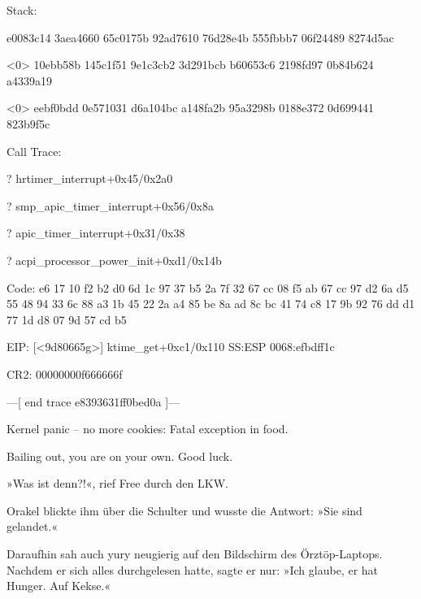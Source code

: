 \begin{tiny}
\begin{ttfamily}
\noindent [376730.313461] Stack:

\noindent [376730.313461]  e0083c14 3aea4660 65c0175b 92ad7610 76d28e4b 555fbbb7 06f24489 8274d5ac

\noindent [376730.313461] \textless{}0\textgreater{} 10ebb58b 145c1f51 9e1c3cb2 3d291bcb b60653c6 2198fd97 0b84b624 a4339a19

\noindent [376730.313461] \textless{}0\textgreater{} eebf0bdd 0e571031 d6a104bc a148fa2b 95a3298b 0188e372 0d699441 823b9f5c

\noindent [376730.313461] Call Trace:

 ? hrtimer\_interrupt+0x45/0x2a0

 ? smp\_apic\_timer\_interrupt+0x56/0x8a

 ? apic\_timer\_interrupt+0x31/0x38

 ? acpi\_processor\_power\_init+0xd1/0x14b

\noindent [376730.313461] Code: e6 17 10 f2 b2 d0 6d 1c 97 37 b5 2a 7f 32 67 cc 08 f5 ab 67 cc 97 d2 6a d5 55 48 94 33 6c 88 a3 1b 45 22 2a a4 85 be 8a ad 8c bc 41 74 c8 17 9b 92 76 dd d1 77 1d d8 07 9d 57 cd b5

\noindent [376730.313461] EIP: [<9d80665g\textgreater{}] ktime\_get+0xc1/0x110 SS:ESP 0068:efbdff1c

\noindent [376730.313461] CR2: 00000000f666666f

\noindent [376730.313461] ---[ end trace e8393631ff0bed0a ]---

\noindent [376730.313461] Kernel panic – no more cookies: Fatal exception in food.

\noindent [376730.313461] Bailing out, you are on your own. Good luck.

    \end{ttfamily}
    \end{tiny}

\bigskip

»Was ist  denn?!«, rief Free durch den LKW.

Orakel blickte ihm über die Schulter und wusste die Antwort: »Sie sind gelandet.«

Daraufhin sah auch yury neugierig auf den Bildschirm des Örztöp-Laptops. Nachdem er sich alles durchgelesen hatte, sagte er nur: »Ich glaube, er hat Hunger. Auf Kekse.«

